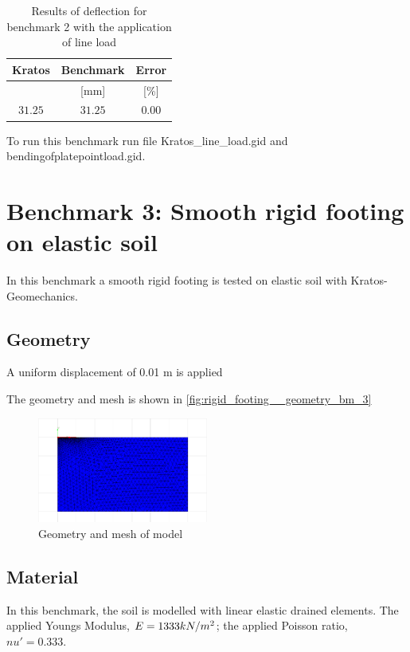 \documentclass{deltares_manual_style}
\begin{document}
\begin{table}[H]
	\caption{Results of deflection for benchmark 2 with the application of line load }
	\label{tab:Resultsbm2.2}
	\centering
		\begin{tabular}{|c|c|c|}
			\hline
			Kratos & Benchmark & Error\\ \hline
			[mm] & [mm] & [\%] \\ \hline  
			$31.25$ & $31.25$ & $0.00$ \\ \hline
		\end{tabular}
\end{table}

To run this benchmark run file Kratos\_line\_load.gid and bendingofplatepointload.gid.



\chapter{Benchmark 3: Smooth rigid footing on elastic soil}
In this benchmark a smooth rigid footing is tested on elastic soil with Kratos-Geomechanics. 

\section{Geometry}

A uniform displacement of 0.01 m is applied

The geometry and mesh is shown in \autoref{fig:rigid_footing__geometry_bm_3}

\begin{figure}[h]
	\centering
	\includegraphics[width=0.50\textwidth]{figures/mesh_rigid_footing_elastic_soil.png}
	\caption{Geometry and mesh of model}
	\label{fig:rigid_footing__geometry_bm_3}
\end{figure}

\section{Material}

In this benchmark, the soil is modelled with linear elastic drained elements. The applied Youngs Modulus, $E = 1333 \space kN/m^{2}$; the applied Poisson ratio, $nu' = 0.333$.
\end{document}
